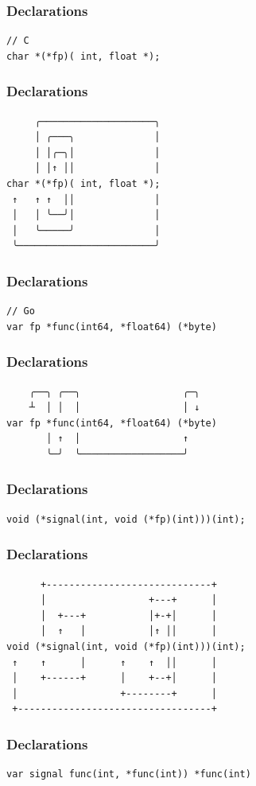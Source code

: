 \documentclass[xelatex,aspectratio=169]{beamer}
\begin{document}
{
\renewcommand{\fcolorbox}[4][]{#4}
\begin{frame}[fragile]
	\frametitle{Declarations}
\begin{verbatim}
// C
char *(*fp)( int, float *);
\end{verbatim}
\end{frame}
\begin{frame}[fragile]
	\frametitle{Declarations}
\begin{verbatim}
     ╭────────────────────╮
     │ ╭───╮              │
     │ │╭─╮│              │
     │ │↑ ││              │
char *(*fp)( int, float *);
 ↑   ↑ ↑  ││              │
 │   │ ╰──╯│              │
 │   ╰─────╯              │
 ╰────────────────────────╯
\end{verbatim}
\end{frame}
\begin{frame}[fragile]
	\frametitle{Declarations}
\begin{verbatim}
// Go
var fp *func(int64, *float64) (*byte)
\end{verbatim}
\end{frame}
\begin{frame}[fragile]
	\frametitle{Declarations}
\begin{verbatim}
    ╭──╮ ╭──╮                  ╭─╮
    ┴  │ │  │                  │ ↓
var fp *func(int64, *float64) (*byte)
       │ ↑  │                  ↑
       ╰─╯  ╰──────────────────╯
\end{verbatim}
\end{frame}
\begin{frame}[fragile]
	\frametitle{Declarations}
\begin{verbatim}
void (*signal(int, void (*fp)(int)))(int);
\end{verbatim}
\end{frame}
\begin{frame}[fragile]
	\frametitle{Declarations}
\begin{verbatim}
      +-----------------------------+
      │                  +---+      │
      │  +---+           │+-+│      │
      │  ↑   │           │↑ ││      │
void (*signal(int, void (*fp)(int)))(int);
 ↑    ↑      │      ↑    ↑  ││      │
 │    +------+      │    +--+│      │
 │                  +--------+      │
 +----------------------------------+
\end{verbatim}
\end{frame}
\begin{frame}[fragile]
	\frametitle{Declarations}
\begin{verbatim}
var signal func(int, *func(int)) *func(int)
\end{verbatim}
\end{frame}
}
\end{document}
